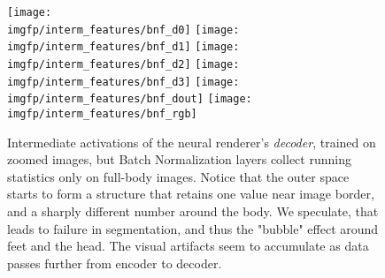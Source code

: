 \begin{figure}
	\centering
	\texttt{[image: \\imgfp/interm\_features/bnf\_d0]}%
	\hfill\texttt{[image: \\imgfp/interm\_features/bnf\_d1]}%
	\hfill\texttt{[image: \\imgfp/interm\_features/bnf\_d2]}%
	\hfill\texttt{[image: \\imgfp/interm\_features/bnf\_d3]}%
	\hfill\texttt{[image: \\imgfp/interm\_features/bnf\_dout]}%
	\hfill\texttt{[image: \\imgfp/interm\_features/bnf\_rgb]}%
	\caption{Intermediate activations of the neural renderer's \textit{decoder}, trained on zoomed images, but Batch Normalization layers collect running statistics only on full-body images. Notice that the outer space starts to form a structure that retains one value near image border, and a sharply different number around the body. We speculate, that leads to failure in segmentation, and thus the "bubble" effect around feet and the head. The visual artifacts seem to accumulate as data passes further from encoder to decoder. }
	\label{fig:interm06_decoder}
\end{figure}


